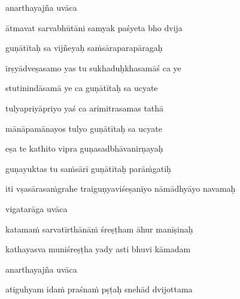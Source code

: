 anarthayajña uvāca~{\dandab}\dontdisplaylinenum 

ātmavat sarvabhūtāni samyak paśyeta bho dvija\thinspace{\danda} \dontdisplaylinenum

guṇātītaḥ sa vijñeyaḥ sa\.msāraparapāragaḥ \veg\dontdisplaylinenum

īrṣyādveṣasamo yas tu sukhaduḥkhasamāś ca ye\thinspace{\dandab} \dontdisplaylinenum

stutinindāsamā ye ca guṇātītaḥ sa ucyate \veg\dontdisplaylinenum

tulyapriyāpriyo yaś ca arimitrasamas tathā\thinspace{\dandab} \dontdisplaylinenum

mānāpamānayos tulyo guṇātītaḥ sa ucyate \veg\dontdisplaylinenum 

eṣa te kathito vipra guṇasadbhāvanirṇayaḥ\thinspace{\dandab} \dontdisplaylinenum

guṇayuktas tu sa\.msārī guṇātītaḥ parā\.mgatiḥ \veg\dontdisplaylinenum


\jump
\begin{center}
\ketdanda iti vṣasārasa\.mgrahe traiguṇyaviśeṣanīyo nāmādhyāyo navamaḥ\ketdanda
\end{center}
\dontdisplaylinenum\vers 
\bekveg\szamveg\vfill\phpspagebreak\szam\bek{}
\thispagestyle{empty}



\jump\jump
\vers

vigatarāga uvāca~{\dandab}\dontdisplaylinenum 

katama\.m sarvatīrthānā\.m śreṣṭham āhur manīṣinaḥ\thinspace{\danda} \dontdisplaylinenum

kathayasva muniśreṣṭha yady asti bhuvi kāmadam \veg\dontdisplaylinenum

anarthayajña uvāca~{\dandab}\dontdisplaylinenum 

atiguhyam ida\.m praśna\.m pṣṭaḥ snehād dvijottama\thinspace{\danda} \dontdisplaylinenum

